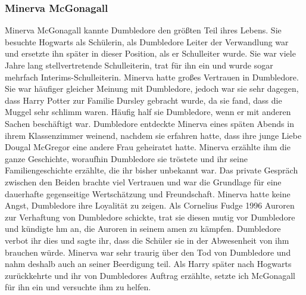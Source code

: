 \documentclass[a4paper, 10pt]{article}
\begin{document}
\subsubsection*{\large Minerva McGonagall}
Minerva McGonagall kannte Dumbledore den größten Teil ihres Lebens. Sie besuchte Hogwarts als Schülerin, als Dumbledore Leiter der Verwandlung war und ersetzte ihn später in dieser Position, als er Schulleiter wurde. Sie war viele Jahre lang
stellvertretende Schulleiterin, trat für ihn ein und wurde sogar mehrfach Interims-Schulleiterin.
\vspace{10pt}
\newline
Minerva hatte großes Vertrauen in Dumbledore. Sie war häufiger gleicher Meinung mit Dumbledore, jedoch war sie sehr dagegen, dass Harry Potter zur Familie Dursley gebracht wurde, da sie fand, dass die Muggel sehr schlimm waren. Häufig half sie Dumbledore, wenn er mit anderen Sachen beschäftigt war.
\vspace{10pt}
\newline
Dumbledore entdeckte Minerva eines späten Abends in ihrem Klassenzimmer weinend, nachdem sie erfahren hatte, dass ihre junge Liebe Dougal McGregor eine andere Frau geheiratet hatte. Minerva erzählte ihm die ganze Geschichte, woraufhin Dumbledore sie tröstete und ihr seine Familiengeschichte erzählte, die ihr bisher unbekannt war. Das private Gespräch zwischen den Beiden brachte viel Vertrauen und war die Grundlage für eine dauerhafte gegenseitige Wertschätzung und Freundschaft.
\vspace{10pt}
\newline
Minerva hatte keine Angst, Dumbledore ihre Loyalität zu zeigen. Als Cornelius Fudge 1996 Auroren zur Verhaftung von Dumbledore schickte, trat sie diesen mutig vor Dumbledore und kündigte hm an, die Auroren in seinem amen zu kämpfen. Dumbledore verbot ihr dies und sagte ihr, dass die Schüler sie in der Abwesenheit von ihm brauchen würde.
\vspace{10pt}
\newline
Minerva war sehr traurig über den Tod von Dumbledore und nahm deshalb auch an seiner Beerdigung teil. Als Harry später nach Hogwarts zurückkehrte und ihr von Dumbledores Auftrag erzählte, setzte ich McGonagall für ihn ein und versuchte ihm zu helfen.
\end{document}
